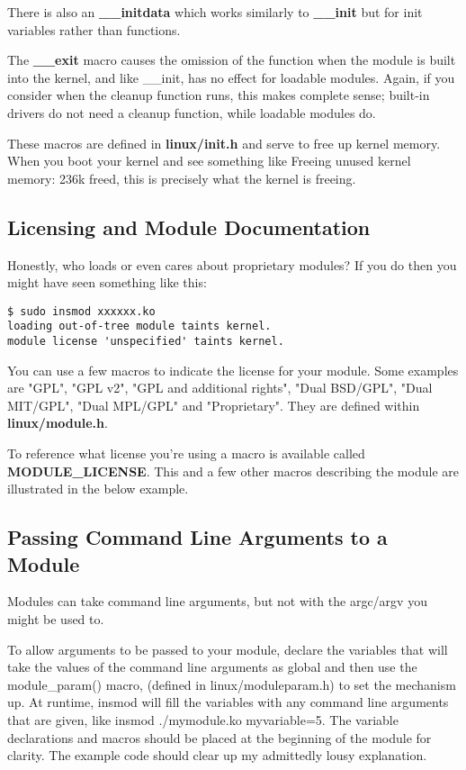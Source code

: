 \documentclass[10pt, oneside]{book}
\begin{document}
There is also an \textbf{\_\_initdata} which works similarly to \textbf{\_\_init} but for init variables rather than functions.

The \textbf{\_\_exit} macro causes the omission of the function when the module is built into the kernel, and like \_\_init, has no effect for loadable modules.
Again, if you consider when the cleanup function runs, this makes complete sense; built-in drivers do not need a cleanup function, while loadable modules do.

These macros are defined in \textbf{linux/init.h} and serve to free up kernel memory.
When you boot your kernel and see something like Freeing unused kernel memory: 236k freed, this is precisely what the kernel is freeing.


\subsection{Licensing and Module Documentation}
\label{modlicense}
Honestly, who loads or even cares about proprietary modules?
If you do then you might have seen something like this:
\begin{verbatim}
$ sudo insmod xxxxxx.ko
loading out-of-tree module taints kernel.
module license 'unspecified' taints kernel.
\end{verbatim}

You can use a few macros to indicate the license for your module.
Some examples are "GPL", "GPL v2", "GPL and additional rights", "Dual BSD/GPL", "Dual MIT/GPL", "Dual MPL/GPL" and "Proprietary".
They are defined within \textbf{linux/module.h}.

To reference what license you're using a macro is available called \textbf{MODULE\_LICENSE}.
This and a few other macros describing the module are illustrated in the below example.


\subsection{Passing Command Line Arguments to a Module}
\label{modparam}
Modules can take command line arguments, but not with the argc/argv you might be used to.

To allow arguments to be passed to your module, declare the variables that will take the values of the command line arguments as global and then use the module\_param() macro, (defined in linux/moduleparam.h) to set the mechanism up.
At runtime, insmod will fill the variables with any command line arguments that are given, like insmod ./mymodule.ko myvariable=5.
The variable declarations and macros should be placed at the beginning of the module for clarity.
The example code should clear up my admittedly lousy explanation.
\end{document}

